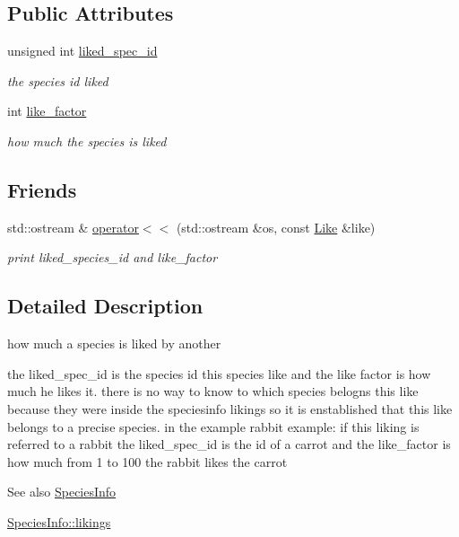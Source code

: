 \subsection*{Public Attributes}
\begin{DoxyCompactItemize}
\item 
\hypertarget{structLike_a5008dbeb4014c5f99618189cfd0ec57e}{
unsigned int \hyperlink{structLike_a5008dbeb4014c5f99618189cfd0ec57e}{liked\_\-spec\_\-id}}
\label{structLike_a5008dbeb4014c5f99618189cfd0ec57e}

\begin{DoxyCompactList}\small\item\em the species id liked \end{DoxyCompactList}\item 
int \hyperlink{structLike_aa10b4912394904201f7c75c4e9868a0f}{like\_\-factor}
\begin{DoxyCompactList}\small\item\em how much the species is liked \end{DoxyCompactList}\end{DoxyCompactItemize}
\subsection*{Friends}
\begin{DoxyCompactItemize}
\item 
\hypertarget{structLike_af6b658acce4e4592a0fcf1febecdccf8}{
std::ostream \& \hyperlink{structLike_af6b658acce4e4592a0fcf1febecdccf8}{operator$<$$<$} (std::ostream \&os, const \hyperlink{structLike}{Like} \&like)}
\label{structLike_af6b658acce4e4592a0fcf1febecdccf8}

\begin{DoxyCompactList}\small\item\em print liked\_\-species\_\-id and like\_\-factor \end{DoxyCompactList}\end{DoxyCompactItemize}


\subsection{Detailed Description}
how much a species is liked by another 

the liked\_\-spec\_\-id is the species id this species like and the like factor is how much he likes it. there is no way to know to which species belogns this like because they were inside the speciesinfo likings so it is enstablished that this like belongs to a precise species. in the example rabbit example: if this liking is referred to a rabbit the liked\_\-spec\_\-id is the id of a carrot and the like\_\-factor is how much from 1 to 100 the rabbit likes the carrot \begin{DoxySeeAlso}{See also}
\hyperlink{structSpeciesInfo}{SpeciesInfo} 

\hyperlink{structSpeciesInfo_a109b3e5acaf126bb8df9648b6c925542}{SpeciesInfo::likings} 
\end{DoxySeeAlso}


